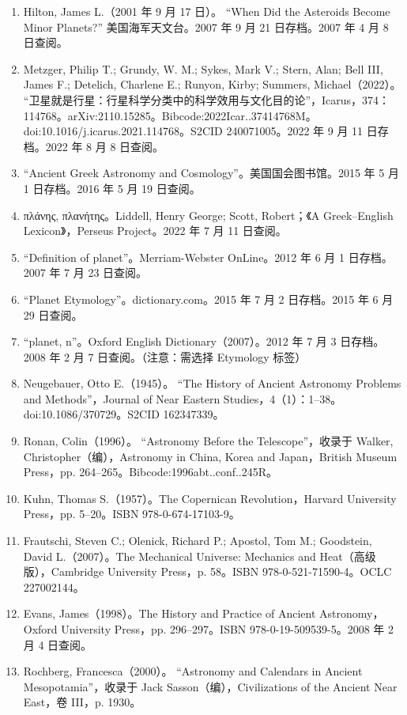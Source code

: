 \begin{enumerate}
\item Hilton, James L.（2001 年 9 月 17 日）。
“When Did the Asteroids Become Minor Planets?” 美国海军天文台。2007 年 9 月 21 日存档。2007 年 4 月 8 日查阅。
\item Metzger, Philip T.; Grundy, W. M.; Sykes, Mark V.; Stern, Alan; Bell III, James F.; Detelich, Charlene E.; Runyon, Kirby; Summers, Michael（2022）。
“卫星就是行星：行星科学分类中的科学效用与文化目的论”，Icarus，374：114768。arXiv:2110.15285。Bibcode:2022Icar..37414768M。doi:10.1016/j.icarus.2021.114768。S2CID 240071005。2022 年 9 月 11 日存档。2022 年 8 月 8 日查阅。
\item “Ancient Greek Astronomy and Cosmology”。美国国会图书馆。2015 年 5 月 1 日存档。2016 年 5 月 19 日查阅。
\item πλάνης, πλανήτης。Liddell, Henry George; Scott, Robert；《A Greek–English Lexicon》，Perseus Project。2022 年 7 月 11 日查阅。
\item “Definition of planet”。Merriam-Webster OnLine。2012 年 6 月 1 日存档。2007 年 7 月 23 日查阅。
\item “Planet Etymology”。dictionary.com。2015 年 7 月 2 日存档。2015 年 6 月 29 日查阅。
\item “planet, n”。Oxford English Dictionary（2007）。2012 年 7 月 3 日存档。2008 年 2 月 7 日查阅。（注意：需选择 Etymology 标签）
\item Neugebauer, Otto E.（1945）。
“The History of Ancient Astronomy Problems and Methods”，Journal of Near Eastern Studies，4（1）：1–38。doi:10.1086/370729。S2CID 162347339。
\item Ronan, Colin（1996）。
“Astronomy Before the Telescope”，收录于 Walker, Christopher（编），Astronomy in China, Korea and Japan，British Museum Press，pp. 264–265。Bibcode:1996abt..conf..245R。
\item Kuhn, Thomas S.（1957）。The Copernican Revolution，Harvard University Press，pp. 5–20。ISBN 978-0-674-17103-9。
\item Frautschi, Steven C.; Olenick, Richard P.; Apostol, Tom M.; Goodstein, David L.（2007）。The Mechanical Universe: Mechanics and Heat（高级版），Cambridge University Press，p. 58。ISBN 978-0-521-71590-4。OCLC 227002144。
\item Evans, James（1998）。The History and Practice of Ancient Astronomy，Oxford University Press，pp. 296–297。ISBN 978-0-19-509539-5。2008 年 2 月 4 日查阅。
\item Rochberg, Francesca（2000）。
“Astronomy and Calendars in Ancient Mesopotamia”，收录于 Jack Sasson（编），Civilizations of the Ancient Near East，卷 III，p. 1930。

\end{enumerate}
